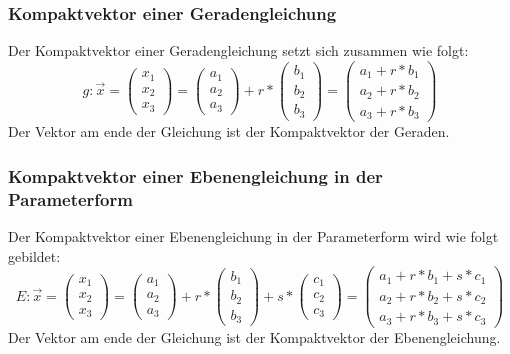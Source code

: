 \documentclass{article}
\begin{document}
\subsubsection{Kompaktvektor einer Geradengleichung} \label{KompaktvektorDerGeradengleichung}
Der Kompaktvektor einer Geradengleichung setzt sich zusammen wie folgt:
\begin{equation}
g : \vec{x} = \begin{pmatrix} x_1 \\ x_2 \\ x_3 \end{pmatrix} = \begin{pmatrix} a_1 \\ a_2 \\ a_3  \end{pmatrix} + r * \begin{pmatrix} b_1 \\ b_2 \\ b_3 \end{pmatrix} = \begin{pmatrix} a_1 + r * b_1 \\ a_2 + r * b_2 \\ a_3 + r * b_3 \end{pmatrix}
\end{equation}
Der Vektor am ende der Gleichung ist der Kompaktvektor der Geraden.

\subsubsection{Kompaktvektor einer Ebenengleichung in der Parameterform}
Der Kompaktvektor einer Ebenengleichung in der Parameterform wird wie folgt gebildet:
\begin{equation}
E : \vec{x} = \begin{pmatrix} x_1 \\ x_2 \\ x_3 \end{pmatrix} = \begin{pmatrix} a_1 \\ a_2 \\ a_3 \end{pmatrix} + r * \begin{pmatrix} b_1 \\ b_2 \\ b_3 \end{pmatrix} + s * \begin{pmatrix} c_1 \\ c_2 \\ c_3 \end{pmatrix} = \begin{pmatrix} a_1 + r * b_1 + s * c_1 \\ a_2 + r * b_2 + s * c_2 \\ a_3 + r * b_3 + s * c_3 \end{pmatrix}
\end{equation}
Der Vektor am ende der Gleichung ist der Kompaktvektor der Ebenengleichung.
\end{document}
